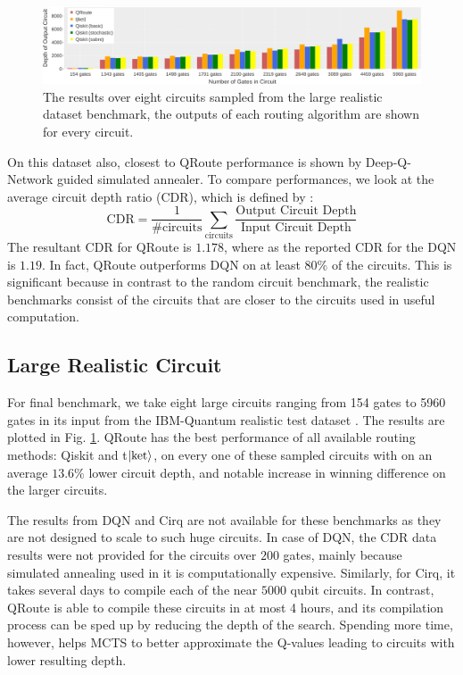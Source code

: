 \begin{figure}[ht]
    \centering
    \includegraphics[width=\linewidth]{figures/qroute/realistic_large_benchmark.pdf}
    \caption[qRoute Results on large realistic circuit set]{\label{fig:results-large}
        The results over eight circuits sampled from the large realistic dataset benchmark, the outputs of each routing algorithm are shown for every circuit.}
\end{figure}

On this dataset also, closest to QRoute performance is shown by Deep-Q-Network guided simulated annealer. To compare performances, we look at the average circuit depth ratio (CDR), which is defined by \cite{qroute_dqn2}:
\begin{equation}
    \text{CDR} = \frac{1}{\textrm{\#circuits}} \sum_{\textrm{circuits}} \frac{\textrm{Output Circuit Depth}}{\textrm{Input Circuit Depth}}
    \label{eq:CDR}
\end{equation}
The resultant CDR for QRoute is $1.178$, where as the reported CDR for the DQN is $1.19$. In fact, QRoute outperforms DQN on at least $80\%$ of the circuits. This is significant because in contrast to the random circuit benchmark, the realistic benchmarks consist of the circuits that are closer to the circuits used in useful computation.


\subsection{\label{sec:results-realistic}Large Realistic Circuit}

For final benchmark, we take eight large circuits ranging from 154 gates to 5960 gates in its input from the IBM-Quantum realistic test dataset \cite{data_realistic}. The results are plotted in Fig.  \ref{fig:results-large}. QRoute has the best performance of all available routing methods: Qiskit and t$\ket{\text{ket}}$, on every one of these sampled circuits with on an average $13.6\%$ lower circuit depth, and notable increase in winning difference on the larger circuits.



The results from DQN and Cirq are not available for these benchmarks as they are not designed to scale to such huge circuits. In case of DQN, the CDR data results were not provided for the circuits over $200$ gates, mainly because simulated annealing used in it is computationally expensive. Similarly, for Cirq, it takes several days to compile each of the near $5000$ qubit circuits. In contrast, QRoute is able to compile these circuits in at most 4 hours, and its compilation process can be sped up by reducing the depth of the search. Spending more time, however, helps MCTS to better approximate the Q-values leading to circuits with lower resulting depth.



